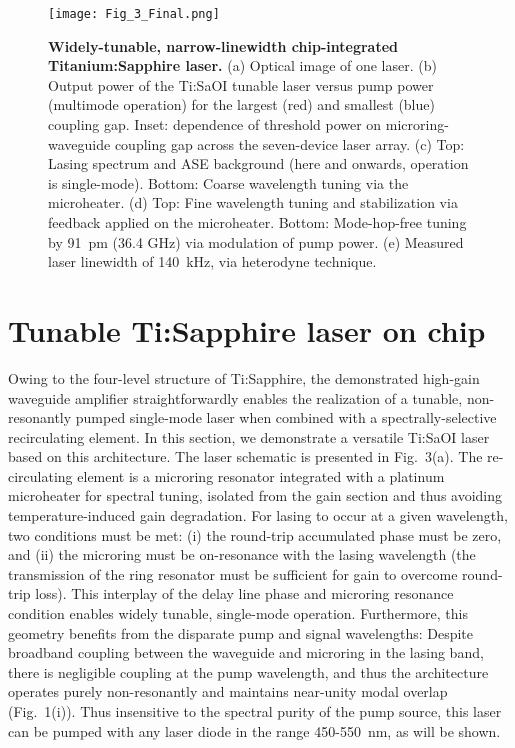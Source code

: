 \documentclass[amsmath, amsthm, amssymb, aps, prb, superscriptaddress, twocolumn, nofootinbib, 10pt]{revtex4-1}%
\begin{document}
\begin{figure*}[t!]
\texttt{[image: Fig\_3\_Final.png]}
\centering
\caption{\textbf{Widely-tunable, narrow-linewidth chip-integrated Titanium:Sapphire laser.} 
(a) Optical image of one laser.
(b) Output power of the Ti:SaOI tunable laser versus pump power (multimode operation) for the largest (red) and smallest (blue) coupling gap. Inset: dependence of threshold power on microring-waveguide coupling gap across the seven-device laser array.
(c) Top: Lasing spectrum and ASE background (here and onwards, operation is single-mode).
Bottom: Coarse wavelength tuning via the microheater.
(d) Top: Fine wavelength tuning and stabilization via feedback applied on the microheater.
Bottom: Mode-hop-free tuning by 91~pm (36.4 GHz) via modulation of pump power. 
(e) Measured laser linewidth of 140~kHz, via heterodyne technique.}
\label{fig_3}
\end{figure*}

\section{Tunable Ti:Sapphire laser on chip}

Owing to the four-level structure of Ti:Sapphire, the demonstrated high-gain waveguide amplifier straightforwardly enables the realization of a tunable, non-resonantly pumped single-mode laser when combined with a spectrally-selective recirculating element. In this section, we demonstrate a versatile Ti:SaOI laser based on this architecture. The laser schematic is presented in Fig.~3(a). The re-circulating element is a microring resonator integrated with a platinum microheater for spectral tuning, isolated from the gain section and thus avoiding temperature-induced gain degradation. For lasing to occur at a given wavelength, two conditions must be met: (i) the round-trip accumulated phase must be zero, and (ii) the microring must be on-resonance with the lasing wavelength (the transmission of the ring resonator must be sufficient for gain to overcome round-trip loss). This interplay of the delay line phase and microring resonance condition enables widely tunable, single-mode operation.  Furthermore, this geometry benefits from the disparate pump and signal wavelengths: Despite broadband coupling between the waveguide and microring in the lasing band, there is negligible coupling at the pump wavelength, and thus the architecture operates purely non-resonantly and maintains near-unity modal overlap (Fig.~1(i)). Thus insensitive to the spectral purity of the pump source, this laser can be pumped with any laser diode in the range 450-550~nm, as will be shown.
\end{document}
